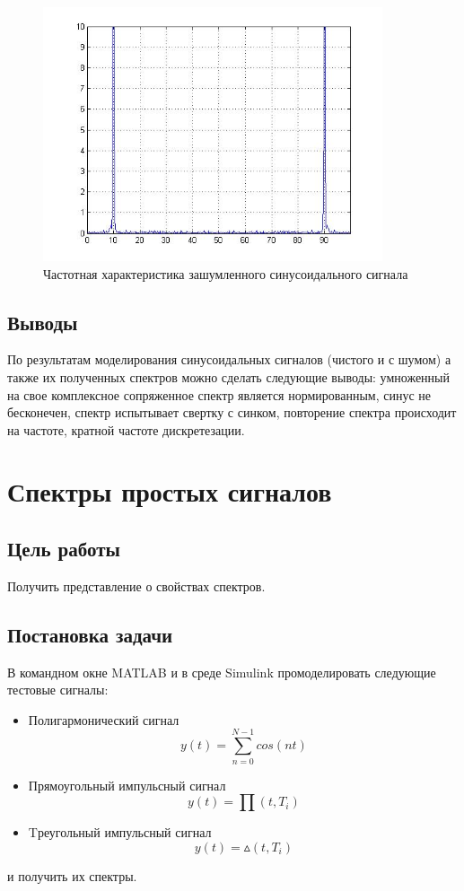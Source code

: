 \documentclass[10pt,a4paper]{article}
\begin{document}
\newpage
\begin{figure}[h]
\centering
\includegraphics[width=10cm]{4.jpg} 
\caption{Частотная характеристика зашумленного синусоидального сигнала} 
\label{fig.3} 
\end{figure}

\subsection{Выводы}
\newpage
По результатам моделирования синусоидальных сигналов (чистого и с шумом) а также их полученных спектров можно сделать следующие выводы: умноженный на свое комплексное сопряженное спектр является нормированным, синус не бесконечен, спектр испытывает свертку с синком, повторение спектра происходит на частоте, кратной частоте дискретезации.

\newpage
\section{Спектры простых сигналов}
\subsection{Цель работы}
Получить представление о свойствах спектров.
\subsection{Постановка задачи}
В командном окне MATLAB и в среде Simulink промоделировать следующие тестовые сигналы:
\begin{itemize}
\item Полигармонический сигнал 
	\begin{equation}
	y(t) = \sum_{n=0}^{{N}-1}cos{(nt)}
	\end{equation}
\item Прямоугольный импульсный сигнал
	\begin{equation}
	y(t) = \prod(t, T_i)
	\end{equation}
\item Tреугольный импульсный сигнал
	\begin{equation}
	y(t) = \vartriangle(t, T_i)
	\end{equation}
\end{itemize}
и получить их спектры.
\end{document}
